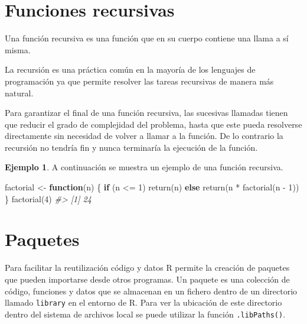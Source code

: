 \documentclass[
]{book}
\newenvironment{Shaded}{\begin{snugshade}}{\end{snugshade}}
\newcommand{\CommentTok}[1]{\textcolor[rgb]{0.56,0.35,0.01}{\textit{#1}}}
\newcommand{\ControlFlowTok}[1]{\textcolor[rgb]{0.13,0.29,0.53}{\textbf{#1}}}
\newcommand{\DecValTok}[1]{\textcolor[rgb]{0.00,0.00,0.81}{#1}}
\newcommand{\FunctionTok}[1]{\textcolor[rgb]{0.00,0.00,0.00}{#1}}
\newcommand{\NormalTok}[1]{#1}
\newcommand{\OtherTok}[1]{\textcolor[rgb]{0.56,0.35,0.01}{#1}}
\newcommand{\SpecialCharTok}[1]{\textcolor[rgb]{0.00,0.00,0.00}{#1}}
\theoremstyle{definition}
\theoremstyle{definition}
\newtheorem{example}{Ejemplo}[chapter]
\theoremstyle{definition}
\theoremstyle{definition}
\theoremstyle{remark}
\begin{document}
\hypertarget{funciones-recursivas}{%
\section{Funciones recursivas}\label{funciones-recursivas}}

Una función recursiva es una función que en su cuerpo contiene una llama a sí misma.

La recursión es una práctica común en la mayoría de los lenguajes de programación ya que permite resolver las tareas recursivas de manera más natural.

Para garantizar el final de una función recursiva, las sucesivas llamadas tienen que reducir el grado de complejidad del problema, hasta que este pueda resolverse directamente sin necesidad de volver a llamar a la función. De lo contrario la recursión no tendría fin y nunca terminaría la ejecución de la función.

\begin{example}

A continuación se muestra un ejemplo de una función recursiva.

\begin{Shaded}
\begin{Highlighting}[]
\NormalTok{factorial }\OtherTok{\textless{}{-}} \ControlFlowTok{function}\NormalTok{(n) \{}
  \ControlFlowTok{if}\NormalTok{ (n }\SpecialCharTok{\textless{}=} \DecValTok{1}\NormalTok{) }\FunctionTok{return}\NormalTok{(n)}
  \ControlFlowTok{else} \FunctionTok{return}\NormalTok{(n }\SpecialCharTok{*} \FunctionTok{factorial}\NormalTok{(n }\SpecialCharTok{{-}} \DecValTok{1}\NormalTok{))}
\NormalTok{\}}
\FunctionTok{factorial}\NormalTok{(}\DecValTok{4}\NormalTok{)}
\CommentTok{\#\textgreater{} [1] 24}
\end{Highlighting}
\end{Shaded}

\end{example}

\hypertarget{paquetes}{%
\section{Paquetes}\label{paquetes}}

Para facilitar la reutilización código y datos R permite la creación de paquetes que pueden importarse desde otros programas. Un paquete es una colección de código, funciones y datos que se almacenan en un fichero dentro de un directorio llamado \texttt{library} en el entorno de R. Para ver la ubicación de este directorio dentro del sistema de archivos local se puede utilizar la función \texttt{.libPaths()}.
\end{document}
